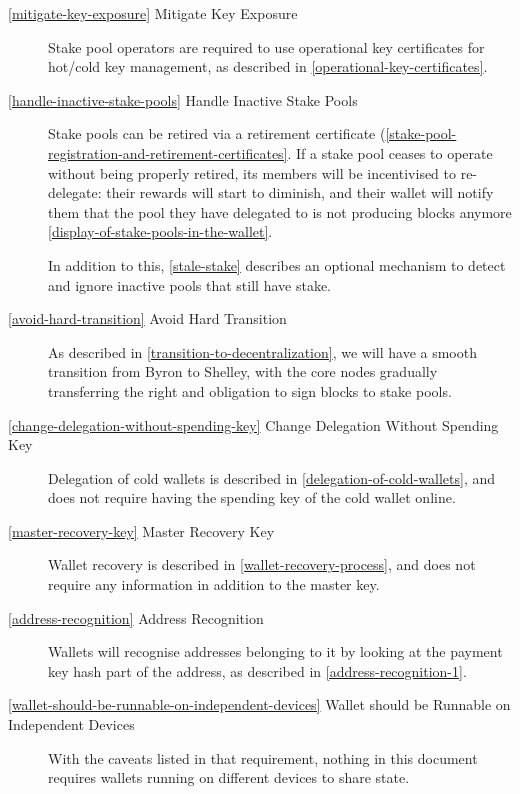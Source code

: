 \documentclass[11pt,a4paper,dvipsnames,twosided]{article}
\begin{document}
\begin{description}
\item[\cref{mitigate-key-exposure} Mitigate Key Exposure] Stake pool operators
  are required to use operational key certificates for hot/cold key management,
  as described in \cref{operational-key-certificates}.

\item[\cref{handle-inactive-stake-pools} Handle Inactive Stake Pools]
  Stake pools can be retired via a retirement certificate
  (\cref{stake-pool-registration-and-retirement-certificates}. If a stake pool
  ceases to operate without being properly retired, its members will be
  incentivised to re-delegate: their rewards will start to diminish, and their
  wallet will notify them that the pool they have delegated to is not producing
  blocks anymore \cref{display-of-stake-pools-in-the-wallet}.

  In addition to this, \cref{stale-stake} describes an optional mechanism to
  detect and ignore inactive pools that still have stake.

\item[\cref{avoid-hard-transition} Avoid Hard Transition] As described
  in \cref{transition-to-decentralization}, we will have a smooth
  transition from Byron to Shelley, with the core nodes gradually
  transferring the right and obligation to sign blocks to stake pools.

\item[\cref{change-delegation-without-spending-key} Change Delegation
  Without Spending Key] Delegation of cold wallets is described in
  \cref{delegation-of-cold-wallets}, and does not require having the
  spending key of the cold wallet online.

\item[\cref{master-recovery-key} Master Recovery Key] Wallet recovery
  is described in \cref{wallet-recovery-process}, and does not require
  any information in addition to the master key.

\item[\cref{address-recognition} Address Recognition] Wallets will
  recognise addresses belonging to it by looking at the payment key
  hash part of the address, as described in
  \cref{address-recognition-1}.

\item[\cref{wallet-should-be-runnable-on-independent-devices} Wallet
  should be Runnable on Independent Devices] With the caveats listed
  in that requirement, nothing in this document requires wallets
  running on different devices to share state.


\end{description}
\end{document}
